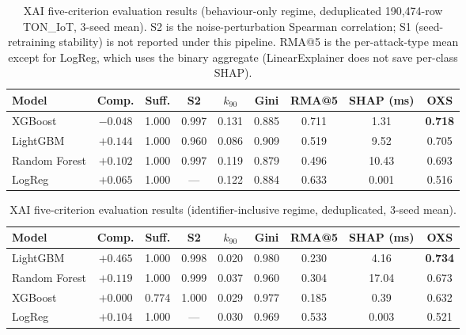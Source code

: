 \documentclass[12pt,a4paper]{report}
\begin{document}
\begin{table}[H]
\centering
\caption{XAI five-criterion evaluation results (behaviour-only regime, deduplicated 190{,}474-row TON\_IoT, 3-seed mean). S2 is the noise-perturbation Spearman correlation; S1 (seed-retraining stability) is not reported under this pipeline. RMA@5 is the per-attack-type mean except for LogReg, which uses the binary aggregate (LinearExplainer does not save per-class SHAP).}
\label{tab:xai-behav}
\small
\begin{adjustbox}{max width=\textwidth}
\begin{tabular}{lcccccccc}
\toprule
\textbf{Model} & \textbf{Comp.} & \textbf{Suff.} & \textbf{S2} & \textbf{$k_{90}$} & \textbf{Gini} & \textbf{RMA@5} & \textbf{SHAP (ms)} & \textbf{OXS} \\
\midrule
XGBoost & $-0.048$ & 1.000 & 0.997 & 0.131 & 0.885 & 0.711 & 1.31 & \textbf{0.718} \\
LightGBM & $+0.144$ & 1.000 & 0.960 & 0.086 & 0.909 & 0.519 & 9.52 & 0.705 \\
Random Forest & $+0.102$ & 1.000 & 0.997 & 0.119 & 0.879 & 0.496 & 10.43 & 0.693 \\
LogReg & $+0.065$ & 1.000 & --- & 0.122 & 0.884 & 0.633 & 0.001 & 0.516 \\
\bottomrule
\end{tabular}
\end{adjustbox}
\end{table}

\begin{table}[htbp]
\centering
\caption{XAI five-criterion evaluation results (identifier-inclusive regime, deduplicated, 3-seed mean).}
\label{tab:xai-ident}
\small
\begin{adjustbox}{max width=\textwidth}
\begin{tabular}{lcccccccc}
\toprule
\textbf{Model} & \textbf{Comp.} & \textbf{Suff.} & \textbf{S2} & \textbf{$k_{90}$} & \textbf{Gini} & \textbf{RMA@5} & \textbf{SHAP (ms)} & \textbf{OXS} \\
\midrule
LightGBM & $+0.465$ & 1.000 & 0.998 & 0.020 & 0.980 & 0.230 & 4.16 & \textbf{0.734} \\
Random Forest & $+0.119$ & 1.000 & 0.999 & 0.037 & 0.960 & 0.304 & 17.04 & 0.673 \\
XGBoost & $+0.000$ & 0.774 & 1.000 & 0.029 & 0.977 & 0.185 & 0.39 & 0.632 \\
LogReg & $+0.104$ & 1.000 & --- & 0.030 & 0.969 & 0.533 & 0.003 & 0.521 \\
\bottomrule
\end{tabular}
\end{adjustbox}
\end{table}
\end{document}
